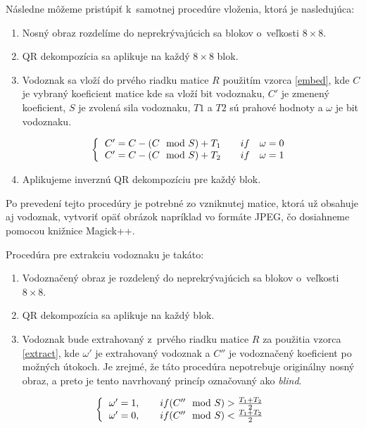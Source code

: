 Následne môžeme pristúpiť k~samotnej procedúre vloženia, ktorá je nasledujúca:
\begin{enumerate}
\item Nosný obraz rozdelíme do neprekrývajúcich sa blokov o~veľkosti $8\times8$.
\item QR dekompozícia sa aplikuje na každý $8\times8$ blok.
\item Vodoznak sa vloží do prvého riadku matice $R$ použitím vzorca \ref{embed}, kde $C$ je vybraný koeficient matice kde sa vloží bit vodoznaku, $C'$ je zmenený koeficient, $S$ je zvolená sila vodoznaku, $T1$ a $T2$ sú prahové hodnoty a $\omega$ je bit vodoznaku.

\begin{equation} \label{embed}
\left \{
  \begin{tabular}{c}
  $C' = C - (C\mod S) + T_1 \qquad if \quad \omega = 0$ \\
  $C' = C - (C\mod S) + T_2 \qquad if \quad \omega = 1$
  \end{tabular}
\right.
\end{equation}
\item Aplikujeme inverznú QR dekompozíciu pre každý blok.
\end{enumerate}

Po prevedení tejto procedúry je potrebné zo vzniknutej matice, ktorá už obsahuje aj vodoznak, vytvoriť opäť obrázok napríklad vo formáte JPEG, čo dosiahneme pomocou knižnice Magick++.

Procedúra pre extrakciu vodoznaku je takáto:
\begin{enumerate}
\item Vodoznačený obraz je rozdelený do neprekrývajúcich sa blokov o~veľkosti $8\times8$.
\item QR dekompozícia sa aplikuje na každý blok.
\item Vodoznak bude extrahovaný z~prvého riadku matice $R$ za použitia vzorca \ref{extract}, kde $\omega'$ je extrahovaný vodoznak a $C''$ je vodoznačený koeficient po možných útokoch. Je zrejmé, že táto procedúra nepotrebuje originálny nosný obraz, a preto je tento navrhovaný princíp označovaný ako {\it blind}.
\end{enumerate}

\begin{equation} \label{extract}
\left \{
  \begin{tabular}{c}
  $\omega' = 1,\qquad if (C''\mod S) > \frac{T_1+T_2}{2}$ \\
  $\omega' = 0,\qquad if (C''\mod S) < \frac{T_1+T_2}{2}$
  \end{tabular}
\right.
\end{equation}


